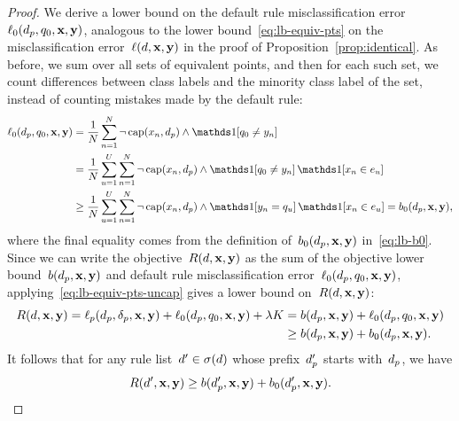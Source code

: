 \begin{arxiv}
\begin{proof}
We derive a lower bound on the default rule
misclassification error~$\ell_0(d_p, q_0, \mathbf{x}, \mathbf{y})$,
analogous to the lower bound~\eqref{eq:lb-equiv-pts} on the misclassification
error~$\ell({d}, \mathbf{x}, \mathbf{y})$ in the proof of Proposition~\ref{prop:identical}.
%
As before, we sum over all sets of equivalent points, and then for each such set,
we count differences between class labels and the minority class label of the set,
instead of counting mistakes made by the default rule:
\begin{align}
\Loss_0(\Prefix, \Default, \x, \y)
&= \frac{1}{N} \sum_{n=1}^N \neg\, \Cap(x_n, \Prefix) \wedge \one [ q_0 \neq y_n ] \nn \\
&= \frac{1}{N} \sum_{u=1}^U \sum_{n=1}^N \neg\, \Cap(x_n, \Prefix) \wedge
  \one [ q_0 \neq y_n ]\, \one [ x_n \in e_u ] \nn \\
&\ge \frac{1}{N} \sum_{u=1}^U \sum_{n=1}^N \neg\, \Cap(x_n, \Prefix) \wedge
  \one [ y_n = q_u ]\, \one [ x_n \in e_u ] = b_0(\Prefix, \x, \y),
\label{eq:lb-equiv-pts-uncap}
\end{align}
where the final equality comes from the definition of~$b_0(d_p, \mathbf{x}, \mathbf{y})$ in~\eqref{eq:lb-b0}.
%
Since we can write the objective~$R({d}, \mathbf{x}, \mathbf{y})$
as the sum of the objective lower bound~$b(d_p, \mathbf{x}, \mathbf{y})$ and
default rule misclassification error~$\ell_0(d_p, q_0, \mathbf{x}, \mathbf{y})$,
applying~\eqref{eq:lb-equiv-pts-uncap} gives a lower bound on~$R({d}, \mathbf{x}, \mathbf{y})$:
\begin{align}
R({d}, \mathbf{x}, \mathbf{y})
= \ell_p(d_p, \delta_p, \mathbf{x}, \mathbf{y}) + \ell_0(d_p, q_0, \mathbf{x}, \mathbf{y}) + {\lambda} K
&= b(d_p, \mathbf{x}, \mathbf{y}) + \ell_0(d_p, q_0, \mathbf{x}, \mathbf{y}) \nonumber \\
&\ge b(d_p, \mathbf{x}, \mathbf{y}) + b_0(d_p, \mathbf{x}, \mathbf{y}).
\label{eq:equiv-pts-base}
\end{align}
It follows that for any rule list~${{d}' \in \sigma({d})}$ whose prefix~$d_p'$
starts with~$d_p$, we have
\begin{align}
R({d}', \mathbf{x}, \mathbf{y}) \ge b(d_p', \mathbf{x}, \mathbf{y}) + b_0(d_p', \mathbf{x}, \mathbf{y}).
\label{eq:equiv-pts-extend}
\end{align}


\end{proof}
\end{arxiv}

